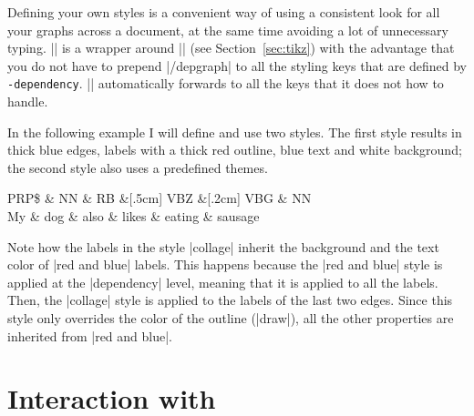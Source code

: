 \documentclass[a4paper]{ltxdoc}
\def\pkgname{\tikzname{}\texttt{-dependency}}
\begin{document}
\begin{command}{\depstyle{}}
   
   Defining your own styles is a convenient way of using a consistent look for all your graphs across a document, at the same time avoiding a lot of unnecessary typing. |\depstyle| is a wrapper around |\tikzset| (see Section~\ref{sec:tikz}) with the advantage that you do not have to prepend |/depgraph| to all the styling keys that are defined by \pkgname{}. |\depstyle| automatically forwards to \tikzname{} all the keys that it does not how to handle.

   In the following example I will define and use two styles. The first style results in thick blue edges, labels with a thick red outline, blue text and white background; the second style also uses a predefined themes.

\begin{codeexample}[]
\begin{dependency}
   \begin{deptext}[column sep=.5cm, row sep=.5ex]
      PRP\$ \& NN \& RB \&[.5cm] VBZ \&[.2cm] VBG \& NN \\
      My \& dog \& also \& likes \& eating \& sausage \\
   \end{deptext}
\end{dependency}
\end{codeexample}

Note how the labels in the style |collage| inherit the background and the text color of |red and blue| labels. This happens because the |red and blue| style is applied at the |dependency| level, meaning that it is applied to all the labels. Then, the |collage| style is applied to the labels of the last two edges. Since this style only overrides the color of the outline (|draw|), all the other properties are inherited from |red and blue|.
\end{command}

\section{Interaction with \tikzname{}}
\end{document}
